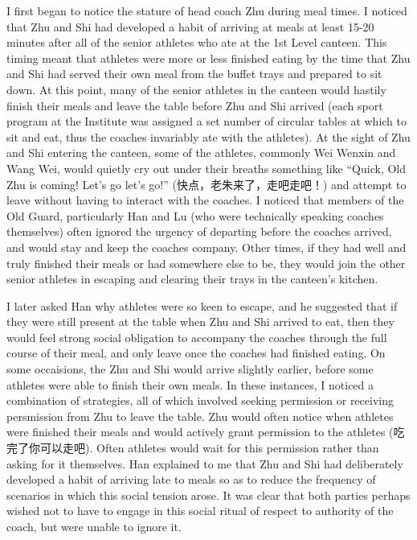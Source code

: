 I first began to notice the stature of head coach Zhu during meal times.  I noticed that Zhu and Shi had developed a habit of arriving at meals at least 15-20 minutes after all of the senior athletes who ate at the 1st Level canteen.  This timing meant that athletes were more or less finished eating by the time that Zhu and Shi had served their own meal from the buffet trays and prepared to sit down.  At this point, many of the senior athletes in the canteen would hastily finish their meals and leave the table before Zhu and Shi arrived (each sport program at the Institute was assigned a set number of circular tables at which to sit and eat, thus the coaches invariably ate with the athletes). At the sight of Zhu and Shi entering the canteen, some of the athletes, commonly Wei Wenxin and Wang Wei, would quietly cry out under their breaths something like ``Quick, Old Zhu is coming!  Let's go let's go!'' (快点，老朱来了，走吧走吧！) and attempt to leave without having to interact with the coaches.  I noticed that members of the Old Guard, particularly Han and Lu (who were technically speaking coaches themselves) often ignored the urgency of departing before the coaches arrived, and would stay and keep the coaches company. Other times, if they had well and truly finished their meals or had somewhere else to be, they would join the other senior athletes in escaping and clearing their trays in the canteen's kitchen.

I later asked Han why athletes were so keen to escape, and he suggested that if they were still present at the table when Zhu and Shi arrived to eat, then they would feel strong social obligation to accompany the coaches through the full course of their meal, and only leave once the coaches had finished eating.  On some occaisions, the Zhu and Shi would arrive slightly earlier, before some athletes were able to finish their own meals.  In these instances, I noticed a combination of strategies, all of which involved seeking permission or receiving persmission from Zhu to leave the table.  Zhu would often notice when athletes were finished their meals and would actively grant permission to the athletes (吃完了你可以走吧).  Often athletes would wait for this permission rather than asking for it themselves.  Han explained to me that Zhu and Shi had deliberately developed a habit of arriving late to meals so as to reduce the frequency of scenarios in which this social tension arose.  It was clear that both parties perhaps wished not to have to engage in this social ritual of respect to authority of the coach, but were unable to ignore it.

